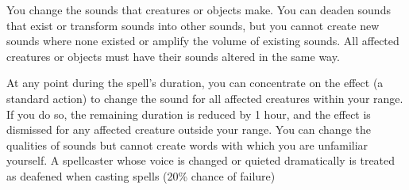 \spelldur{\durext \dismissable}
\spelleffect You change the sounds that creatures or objects make. You can deaden sounds that exist or transform sounds into other sounds, but you cannot create new sounds where none existed or amplify the volume of existing sounds. All affected creatures or objects must have their sounds altered in the same way.

At any point during the spell's duration, you can concentrate on the effect (a standard action) to change the sound for all affected creatures within your range. If you do so, the remaining duration is reduced by 1 hour, and the effect is dismissed for any affected creature outside your range.
\spellnotes You can change the qualities of sounds but cannot create words with which you are unfamiliar yourself. A spellcaster whose voice is changed or quieted dramatically is treated as deafened when casting spells (20\% chance of failure)

